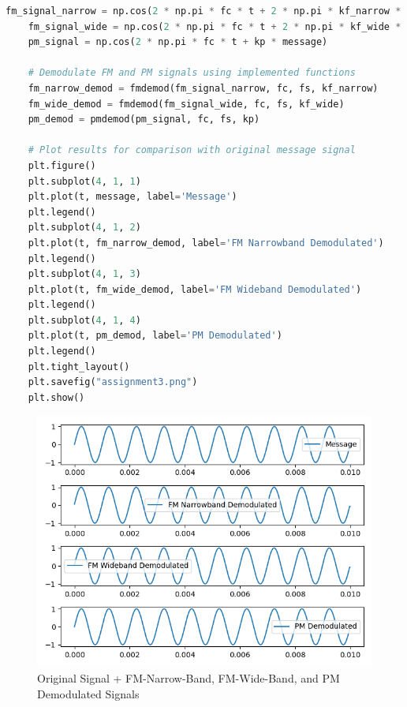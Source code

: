 \documentclass[
	letterpaper, %
	10pt, %
]{CSUniSchoolLabReport}
\begin{document}
\begin{lstlisting}[language=Python]
	fm_signal_narrow = np.cos(2 * np.pi * fc * t + 2 * np.pi * kf_narrow * integrated_message)
	fm_signal_wide = np.cos(2 * np.pi * fc * t + 2 * np.pi * kf_wide * integrated_message)
	pm_signal = np.cos(2 * np.pi * fc * t + kp * message)
	
	# Demodulate FM and PM signals using implemented functions
	fm_narrow_demod = fmdemod(fm_signal_narrow, fc, fs, kf_narrow)
	fm_wide_demod = fmdemod(fm_signal_wide, fc, fs, kf_wide)
	pm_demod = pmdemod(pm_signal, fc, fs, kp)
	
	# Plot results for comparison with original message signal
	plt.figure()
	plt.subplot(4, 1, 1)
	plt.plot(t, message, label='Message')
	plt.legend()
	plt.subplot(4, 1, 2)
	plt.plot(t, fm_narrow_demod, label='FM Narrowband Demodulated')
	plt.legend()
	plt.subplot(4, 1, 3)
	plt.plot(t, fm_wide_demod, label='FM Wideband Demodulated')
	plt.legend()
	plt.subplot(4, 1, 4)
	plt.plot(t, pm_demod, label='PM Demodulated')
	plt.legend()
	plt.tight_layout()
	plt.savefig("assignment3.png")
	plt.show()

\end{lstlisting}

\begin{figure}[H] %
	\centering %
	\includegraphics[width=1.2\textwidth]{assignment3.png} %
	\caption{Original Signal + FM-Narrow-Band, FM-Wide-Band, and PM Demodulated Signals}
	\label{fig:block}
\end{figure}
\end{document}
